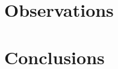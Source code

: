 \section{Observations}\label{sec:HS_14008_observations}


\section{Conclusions}\label{sec:HS_14008_conclusion}
